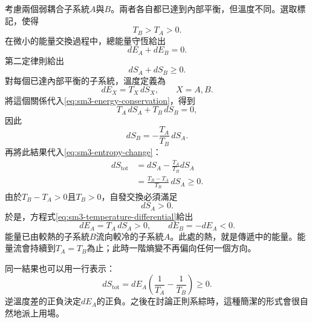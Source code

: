 考慮兩個弱耦合子系統\(A\)與\(B\)。兩者各自都已達到內部平衡，但溫度不同。選取標記，使得\begin{equation}
 T_B>T_A>0.
 \label{eq:sm3-temperature-order}
\end{equation}在微小的能量交換過程中，總能量守恆給出\begin{equation}
 dE_A+dE_B=0.
 \label{eq:sm3-energy-conservation}
\end{equation}第二定律則給出\begin{equation}
 dS_A+dS_B\geq0.
 \label{eq:sm3-entropy-change}
\end{equation}對每個已達內部平衡的子系統，溫度定義為\begin{equation}
 dE_X=T_X\,dS_X,
 \qquad X=A,B.
 \label{eq:sm3-temperature-differential}
\end{equation}將這個關係代入\eqref{eq:sm3-energy-conservation}，得到\begin{equation}
 T_A\,dS_A+T_B\,dS_B=0,
\end{equation}因此\begin{equation}
 dS_B=-\frac{T_A}{T_B}\,dS_A.
 \label{eq:sm3-dsb}
\end{equation}再將此結果代入\eqref{eq:sm3-entropy-change}：\begin{align}
 dS_{\mathrm{tot}}
 &=dS_A-\frac{T_A}{T_B}dS_A\\
 &=\frac{T_B-T_A}{T_B}\,dS_A\geq0.
 \label{eq:sm3-flow-entropy}
\end{align}由於\(T_B-T_A>0\)且\(T_B>0\)，自發交換必須滿足\[
 dS_A>0.
\]於是，方程式\eqref{eq:sm3-temperature-differential}給出\begin{equation}
 dE_A=T_A\,dS_A>0,
 \qquad
 dE_B=-dE_A<0.
 \label{eq:sm3-hot-to-cold}
\end{equation}能量已由較熱的子系統\(B\)流向較冷的子系統\(A\)。此處的熱，就是傳遞中的能量。能量流會持續到\(T_A=T_B\)為止；此時一階熵變不再偏向任何一個方向。

同一結果也可以用一行表示：\begin{equation}
 dS_{\mathrm{tot}}
 =dE_A\left(\frac{1}{T_A}-\frac{1}{T_B}\right)\geq0.
 \label{eq:sm3-compact-flow}
\end{equation}逆溫度差的正負決定\(dE_A\)的正負。之後在討論正則系綜時，這種簡潔的形式會很自然地派上用場。

\begin{classroomqa}\end{classroomqa}

